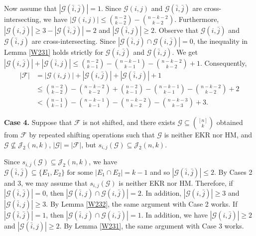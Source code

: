 \documentclass[11pt]{article}
\numberwithin{equation}{section}
\begin{document}
Now assume that $|\mathcal{G}(\bar{i},\bar{j})|= 1$.
 Since $\mathcal{G}(i,j)$ and $\mathcal{G}(\bar{i},\bar{j})$ are cross-intersecting, we have
$
|\mathcal{G}(i,j)|\leq \binom{n-2}{k-2}-\binom{n-k-2}{k-2}.
$
Furthermore, $|\mathcal{G}(i,\bar{j})|\geq 3-|\mathcal{G}(\bar{i},\bar{j})|=2$ and $|\mathcal{G}(\bar{i},j)|\geq 2$.  Observe that $\mathcal{G}(i,\bar{j})$ and $\mathcal{G}(\bar{i},j)$ are cross-intersecting. 
Since $|\mathcal{G}(\bar{i},j)\cap \mathcal{G}(i,\bar{j})|=0$, the inequality in Lemma \ref{W231} holds strictly for 
 $\mathcal{G}(i,\bar{j})$ and  $\mathcal{G}(\bar{i},j)$.  We get 
$
|\mathcal{G}(i,\bar{j})|+|\mathcal{G}(\bar{i}, j)| \leq\binom{n-2}{k-1}-\binom{n-k-1}{k-1}-\binom{n-k-2}{k-2}+1.
$
Consequently,
\begin{align*}
|\mathcal{F}|&=|\mathcal{G}(i,j)|+|\mathcal{G}(i,\bar{j})|+|\mathcal{G}(\bar{i}, j)|+1\\
&\leq \binom{n-2}{k-2}-\binom{n-k-2}{k-2}+\binom{n-2}{k-1}-\binom{n-k-1}{k-1}-\binom{n-k-2}{k-2}+2\\
&<\binom{n-1}{k-1}-\binom{n-k-1}{k-1}-\binom{n-k-2}{k-2}-\binom{n-k-3}{k-3}+3.
\end{align*}




{\bf Case 4.}
 Suppose that $\mathcal{F}$ is not shifted, and there exists $\mathcal{G} \subseteq\binom{[n]}{k}$ obtained from $\mathcal{F}$ by repeated shifting operations such that $\mathcal{G}$  is neither EKR nor HM, and  $\mathcal{G} \nsubseteq \mathcal{J}_2(n, k)$, $|\mathcal{G}|=|\mathcal{F}|$, but
$s_{i, j}(\mathcal{G})\subseteq \mathcal{J}_2(n, k)$.

Since $s_{i, j}(\mathcal{G})\subseteq \mathcal{J}_2(n, k)$, we have $\mathcal{G}(\bar{i},\bar{j})\subseteq \{E_1, E_2\} \text{ for some } |E_1\cap E_2|=k-1$ and so $|\mathcal{G}(\bar{i},\bar{j})|\leq 2$.
By Cases 2 and 3, we may assume that $s_{i, j}(\mathcal{G})$ is neither EKR nor HM. Therefore, if  $|\mathcal{G}(\bar{i},\bar{j})|=0$, then $|\mathcal{G}(\bar{i},j)\cap \mathcal{G}(i,\bar{j})|=2$.
In addition,  $|\mathcal{G}(i,\bar{j})|\geq 3$ and $|\mathcal{G}(\bar{i},j)|\geq 3$. By Lemma \ref{W232}, the same argument with Case 2 works. If  $|\mathcal{G}(\bar{i},\bar{j})|=1$, then $|\mathcal{G}(\bar{i},j)\cap \mathcal{G}(i,\bar{j})|=1$. In addition, we have $|\mathcal{G}(i,\bar{j})|\geq 2$ and $|\mathcal{G}(\bar{i},j)|\geq 2$. By Lemma \ref{W231}, the same argument with Case 3 works.
\end{document}
